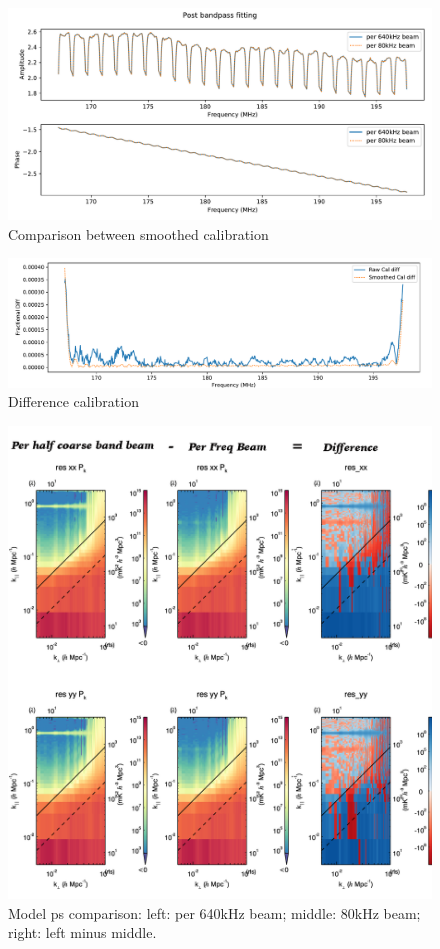 \documentclass[10pt]{extarticle}
\begin{document}
\begin{figure}
    \centering
    \includegraphics[width=0.8\linewidth]{fit_cal.pdf}
    \caption{Comparison between smoothed calibration}
    \label{fig:fit_cal}
\end{figure}

\begin{figure}
    \centering
    \includegraphics[width=0.8\linewidth]{diff_cal.pdf}
    \caption{Difference calibration}
    \label{fig:diff_cal}
\end{figure}

\begin{figure}
    \centering
    \includegraphics[width=\linewidth]{MODEL.png}
    \caption{Model ps comparison: left: per 640kHz beam; middle: 80kHz beam; right: left minus middle.}
    \label{fig:ps_model}
\end{figure}
\end{document}
